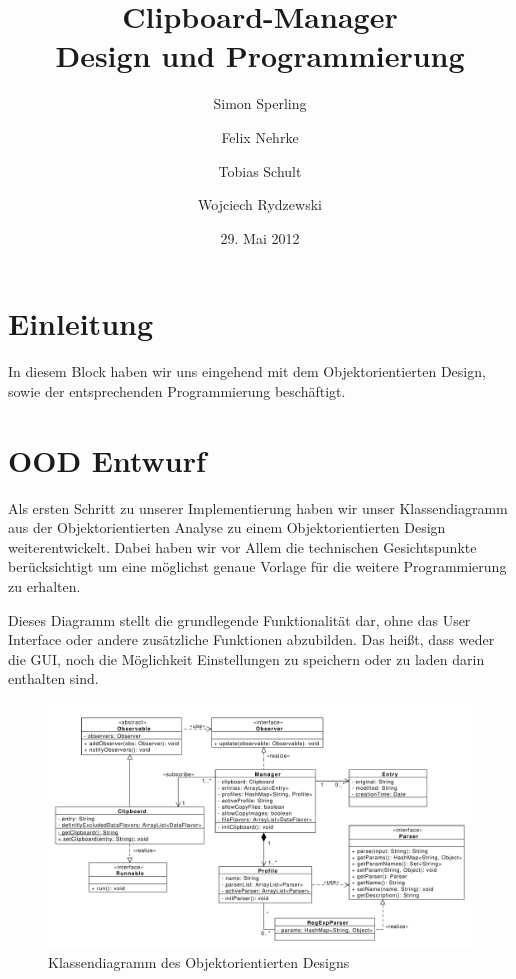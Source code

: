 \documentclass[a4paper,11pt,abstracton,titlepage]{scrartcl}
\title{Clipboard-Manager\\Design und Programmierung}
\author{Simon Sperling\and Felix Nehrke\and Tobias Schult\and Wojciech
Rydzewski} %
\date{29. Mai 2012}
\begin{document}
\maketitle

\tableofcontents
\thispagestyle{empty}
\newpage
\setlength{\parskip}{1em} 
\setcounter{page}{1}

\section{Einleitung}
In diesem Block haben wir uns eingehend mit dem Objektorientierten Design, sowie
der entsprechenden Programmierung beschäftigt.

\section{OOD Entwurf}
Als ersten Schritt zu unserer Implementierung haben wir unser Klassendiagramm
aus der Objektorientierten Analyse zu einem Objektorientierten Design
weiterentwickelt. Dabei haben wir vor Allem die technischen Gesichtspunkte
berücksichtigt um eine möglichst genaue Vorlage für die weitere Programmierung
zu erhalten.

Dieses Diagramm stellt die grundlegende Funktionalität dar, ohne das User
Interface oder andere zusätzliche Funktionen abzubilden. Das heißt, dass weder
die GUI, noch die Möglichkeit Einstellungen zu speichern oder zu laden darin
enthalten sind.

\begin{figure}[hb]
  \centering
\includegraphics[width=\dimexpr\textwidth]{4-klassendiagramm-ood.pdf}
  \caption[OOD]%
  {Klassendiagramm des Objektorientierten Designs}
\end{figure}
\end{document}
